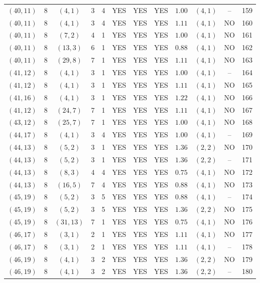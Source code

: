 \begin{longtable}{|c|c|c|c|c|c|c|c|c|c|c|c|}
$(40,11)$ & 8 & $(4,1)$ & 3 & 4 & YES & YES & YES & $1.00$ & $(4,1)$ & -- & 159\\
$(40,11)$ & 8 & $(4,1)$ & 3 & 4 & YES & YES & YES & $1.11$ & $(4,1)$ & NO & 160\\
$(40,11)$ & 8 & $(7,2)$ & 4 & 1 & YES & YES & YES & $1.00$ & $(4,1)$ & NO & 161\\
$(40,11)$ & 8 & $(13,3)$ & 6 & 1 & YES & YES & YES & $0.88$ & $(4,1)$ & NO & 162\\
$(40,11)$ & 8 & $(29,8)$ & 7 & 1 & YES & YES & YES & $1.11$ & $(4,1)$ & NO & 163\\
$(41,12)$ & 8 & $(4,1)$ & 3 & 1 & YES & YES & YES & $1.00$ & $(4,1)$ & -- & 164\\
$(41,12)$ & 8 & $(4,1)$ & 3 & 1 & YES & YES & YES & $1.11$ & $(4,1)$ & NO & 165\\
$(41,16)$ & 8 & $(4,1)$ & 3 & 1 & YES & YES & YES & $1.22$ & $(4,1)$ & NO & 166\\
$(41,12)$ & 8 & $(24,7)$ & 7 & 1 & YES & YES & YES & $1.11$ & $(4,1)$ & NO & 167\\
$(43,12)$ & 8 & $(25,7)$ & 7 & 1 & YES & YES & YES & $1.00$ & $(4,1)$ & NO & 168\\
$(44,17)$ & 8 & $(4,1)$ & 3 & 4 & YES & YES & YES & $1.00$ & $(4,1)$ & -- & 169\\
$(44,13)$ & 8 & $(5,2)$ & 3 & 1 & YES & YES & YES & $1.36$ & $(2,2)$ & NO & 170\\
$(44,13)$ & 8 & $(5,2)$ & 3 & 1 & YES & YES & YES & $1.36$ & $(2,2)$ & -- & 171\\
$(44,13)$ & 8 & $(8,3)$ & 4 & 4 & YES & YES & YES & $0.75$ & $(4,1)$ & NO & 172\\
$(44,13)$ & 8 & $(16,5)$ & 7 & 4 & YES & YES & YES & $0.88$ & $(4,1)$ & NO & 173\\
$(45,19)$ & 8 & $(5,2)$ & 3 & 5 & YES & YES & YES & $0.88$ & $(4,1)$ & -- & 174\\
$(45,19)$ & 8 & $(5,2)$ & 3 & 5 & YES & YES & YES & $1.36$ & $(2,2)$ & NO & 175\\
$(45,19)$ & 8 & $(31,13)$ & 7 & 1 & YES & YES & YES & $0.75$ & $(4,1)$ & NO & 176\\
$(46,17)$ & 8 & $(3,1)$ & 2 & 1 & YES & YES & YES & $1.11$ & $(4,1)$ & NO & 177\\
$(46,17)$ & 8 & $(3,1)$ & 2 & 1 & YES & YES & YES & $1.11$ & $(4,1)$ & -- & 178\\
$(46,19)$ & 8 & $(4,1)$ & 3 & 2 & YES & YES & YES & $1.36$ & $(2,2)$ & NO & 179\\
$(46,19)$ & 8 & $(4,1)$ & 3 & 2 & YES & YES & YES & $1.36$ & $(2,2)$ & -- & 180\\

\end{longtable}
